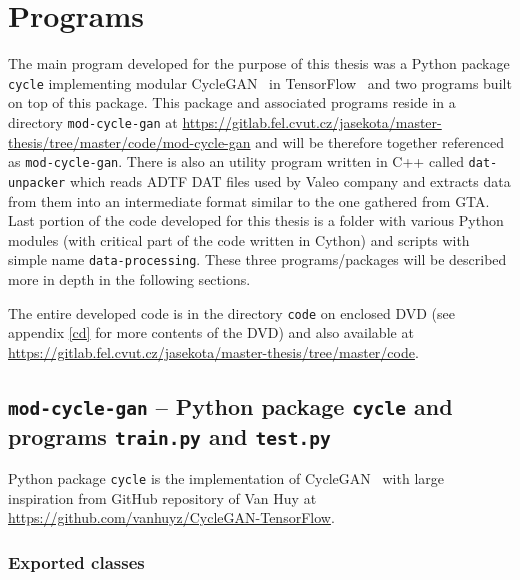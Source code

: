 \chapter{Programs} \label{programs}

The main program developed for the purpose of this thesis was a Python package \texttt{cycle} implementing modular CycleGAN~\cite{cyclegan} in TensorFlow~\cite{tensorflow} and two programs built on top of this package. This package and associated programs reside in a directory \texttt{mod-cycle-gan} at \url{https://gitlab.fel.cvut.cz/jasekota/master-thesis/tree/master/code/mod-cycle-gan} and will be therefore together referenced as \texttt{mod-cycle-gan}. There is also an utility program written in C++ called \texttt{dat-unpacker} which reads ADTF DAT files used by Valeo company and extracts data from them into an intermediate format similar to the one gathered from GTA. Last portion of the code developed for this thesis is a folder with various Python modules (with critical part of the code written in Cython) and scripts with simple name \texttt{data-processing}. These three programs/packages will be described more in depth in the following sections.

The entire developed code is in the directory \texttt{code} on enclosed DVD (see appendix \ref{cd} for more contents of the DVD) and also available at \url{https://gitlab.fel.cvut.cz/jasekota/master-thesis/tree/master/code}.

\section[\texttt{mod-cycle-gan}]{\texttt{mod-cycle-gan} -- Python package \texttt{cycle} and programs \texttt{train.py} and \texttt{test.py}}

Python package \texttt{cycle} is the implementation of CycleGAN~\cite{cyclegan} with large inspiration from GitHub repository of Van Huy at \url{https://github.com/vanhuyz/CycleGAN-TensorFlow}.

\subsection{Exported classes}


